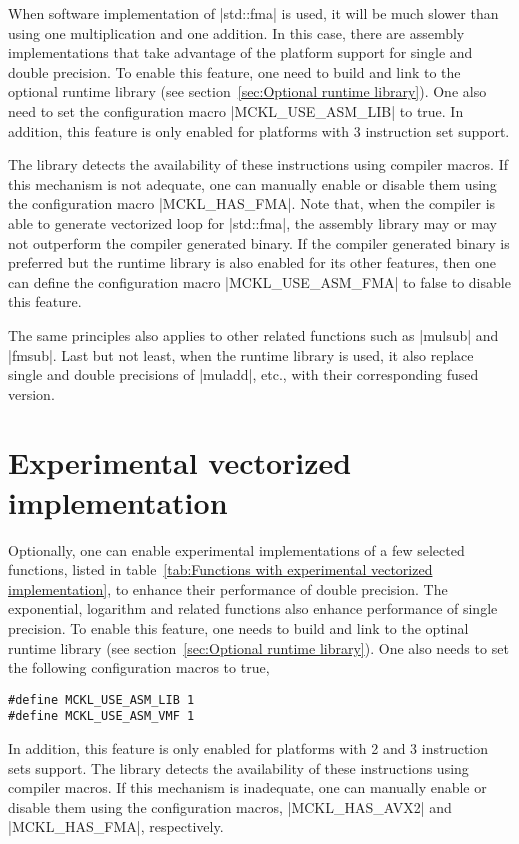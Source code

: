 When software implementation of |std::fma| is used, it will be much slower than
using one multiplication and one addition. In this case, there are assembly
implementations that take advantage of the platform support for single and
double precision. To enable this feature, one need to build and link to the
optional runtime library (see section~\ref{sec:Optional runtime library}). One
also need to set the configuration macro |MCKL_USE_ASM_LIB| to true. In
addition, this feature is only enabled for platforms with \fma{}3 instruction
set support.

The library detects the availability of these instructions using compiler
macros. If this mechanism is not adequate, one can manually enable or disable
them using the configuration macro |MCKL_HAS_FMA|. Note that, when the compiler
is able to generate vectorized loop for |std::fma|, the assembly library may or
may not outperform the compiler generated binary. If the compiler generated
binary is preferred but the runtime library is also enabled for its other
features, then one can define the configuration macro |MCKL_USE_ASM_FMA| to
false to disable this feature.

The same principles also applies to other related functions such as |mulsub|
and |fmsub|. Last but not least, when the runtime library is used, it also
replace single and double precisions of |muladd|, etc., with their
corresponding fused version.

\section{Experimental vectorized implementation}
\label{sec:Experimental vectorized implementation}

Optionally, one can enable experimental implementations of a few selected
functions, listed in table~\ref{tab:Functions with experimental vectorized
implementation}, to enhance their performance of double precision. The
exponential, logarithm and related functions also enhance performance of single
precision. To enable this feature, one needs to build and link to the optinal 
runtime library (see section~\ref{sec:Optional runtime library}). One also
needs to set the following configuration macros to true,
\begin{verbatim}
#define MCKL_USE_ASM_LIB 1
#define MCKL_USE_ASM_VMF 1
\end{verbatim}
In addition, this feature is only enabled for platforms with \avx{}2 and
\fma{}3 instruction sets support. The library detects the availability of these
instructions using compiler macros. If this mechanism is inadequate, one can
manually enable or disable them using the configuration macros, |MCKL_HAS_AVX2|
and |MCKL_HAS_FMA|, respectively.

